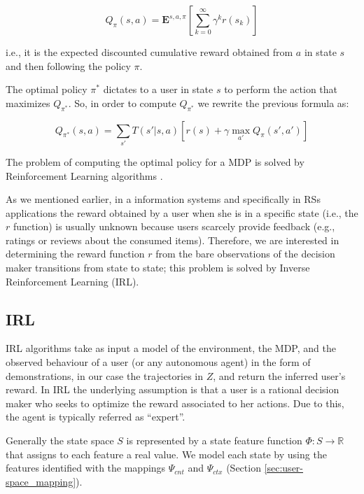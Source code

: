 $$Q_{\pi}(s,a)=\mathbf{E}^{s,a,\pi}[\sum_{k=0}^{\infty} \gamma^k r(s_k)]$$

i.e., it is the expected discounted cumulative reward obtained from $a$ in state $s$ and then following the policy $\pi$.


The optimal policy $\pi^*$ dictates to a user in state $s$ to perform the action that maximizes $Q_{\pi^*}$. So, in order to compute $Q_{\pi^*}$ we rewrite the previous formula as:

$$Q_{\pi^*}(s,a) = \sum_{s'}T(s'|s,a)\left[r(s)+\gamma \max_{a'}{Q_{\pi}(s',a')}\right]$$

The problem of computing the optimal policy for a MDP is solved by Reinforcement Learning algorithms \cite{sutton:1998}.

As we mentioned earlier, in a information systems and specifically in RSs applications the reward obtained by a user when she is in a specific state (i.e., the $r$ function) is usually unknown because users scarcely provide feedback (e.g., ratings or reviews about the consumed items). Therefore, we are interested in determining the reward function $r$ from the bare observations of the decision maker transitions from state to state; this problem is solved by Inverse Reinforcement Learning (IRL). 


\subsection{IRL}
IRL algorithms take as input a model of the environment, the MDP, and the observed behaviour of a user (or any autonomous agent) in the form of demonstrations, in our case the trajectories in $Z$, and return the inferred user's reward. In IRL the underlying assumption is that a user is a rational decision maker who seeks to optimize the reward associated to her actions. Due to this, the agent is typically referred as ``expert''.

Generally the state space $S$ is represented by a state feature function $\Phi:S \rightarrow \mathbb{R}$ that assigns to each feature a real value.
We model each state by using the features identified with the mappings $\Psi_{cnt}$ and $\Psi_{ctx}$ (Section \ref{sec:user-space_mapping}).


